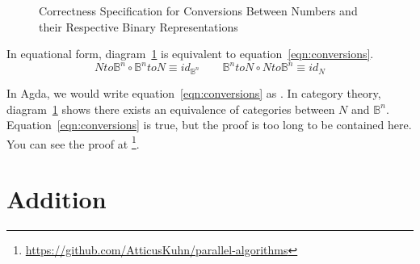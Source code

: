 \documentclass[14pt]{extarticle}  %
\theoremstyle{plain}
\theoremstyle{definition}
\theoremstyle{remark}
\begin{document}
\begin{figure}[h]
\centering
\caption{Correctness Specification for Conversions Between Numbers and their Respective Binary Representations}
\label{fig:conversions}
\end{figure}

In equational form, diagram~\ref{fig:conversions} is equivalent to equation~\ref{eqn:conversions}.
\begin{equation}\label{eqn:conversions}
  Nto\mathbb{B}^{n} \circ \mathbb{B}^{n}toN \equiv id_{\mathbb{B}^{n}} \qquad \mathbb{B}^{n}toN \circ Nto\mathbb{B}^{n} \equiv id_{N}
\end{equation}

In Agda, we would write equation~\ref{eqn:conversions} as .
In category theory, diagram~\ref{fig:conversions} shows there exists an equivalence of categories between $N$ and $\mathbb{B}^{n}$.
Equation~\ref{eqn:conversions} is true, but the proof is too long to be contained here. You can see the proof at \footnote{\url{https://github.com/AtticusKuhn/parallel-algorithms}}.
\section{Addition}
\end{document}
